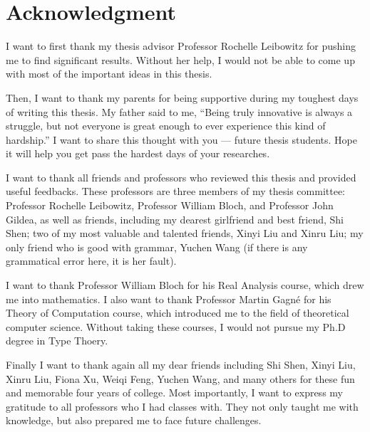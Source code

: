 \chapter{Acknowledgment}

I want to first thank my thesis advisor Professor
Rochelle Leibowitz for pushing me to find significant results.
Without her help,
I would not be able to come up with most of the important
ideas in this thesis.

Then, I want to thank my parents for being supportive
during my toughest days of writing this thesis.
My father said to me,
``Being truly innovative is always a struggle,
but not everyone is great enough
to ever experience this kind of hardship.''
I want to share this thought with you --- future thesis students.
Hope it will help you get pass
the hardest days of your researches.

I want to thank all friends and professors who
reviewed this thesis and provided useful feedbacks.
These professors are three members of my thesis committee:
Professor Rochelle Leibowitz,
Professor William Bloch,
and Professor John Gildea,
as well as friends, including
my dearest girlfriend and best friend, Shi Shen;
two of my most valuable and talented friends,
Xinyi Liu and Xinru Liu;
my only friend who is good with grammar, Yuchen Wang
(if there is any grammatical error here,
it is her fault).

I want to thank Professor William Bloch
for his Real Analysis course,
which drew me into mathematics.
I also want to thank Professor Martin Gagné
for his Theory of Computation course,
which introduced me to the field of theoretical computer science.
Without taking these courses,
I would not pursue my Ph.D degree in Type Thoery.

Finally I want to thank again all my dear friends
including Shi Shen, Xinyi Liu, Xinru Liu, Fiona Xu, Weiqi Feng,
Yuchen Wang, and many others
for these fun and memorable four years of college.
Most importantly,
I want to express my gratitude to all professors
who I had classes with.
They not only taught me with knowledge,
but also prepared me to face future challenges.
